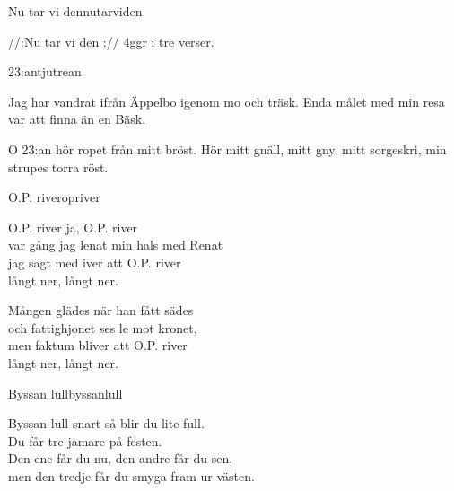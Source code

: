 \begin{song}{Nu tar vi den}{nutarviden}
\begin{vers}
//:Nu tar vi den :// 4ggr i tre verser.\\
\end{vers}
\end{song}

\newpage

\begin{song}{23:an}{tjutrean}
\begin{vers}
Jag har vandrat ifrån Äppelbo
igenom mo och träsk.
Enda målet med min resa var
att finna än en Bäsk.
\end{vers}
\begin{vers}
O 23:an hör ropet från mitt bröst.
Hör mitt gnäll, mitt gny,
mitt sorgeskri,
min strupes torra röst.
\end{vers}
\end{song}



\begin{song}{O.P. river}{opriver}
\begin{vers}
O.P. river ja, O.P. river\\
var gång jag lenat min hals med Renat\\
jag sagt med iver att O.P. river\\
långt ner, långt ner.\\
\end{vers}
\begin{vers}
Mången glädes när han fått sädes\\
och fattighjonet ses le mot kronet,\\
men faktum bliver att O.P. river\\
långt ner, långt ner.\\
\end{vers}
\end{song}

\begin{song}{Byssan lull}{byssanlull} 
\begin{vers}
Byssan lull snart så blir du lite full.\\
Du får tre jamare på festen.\\
Den ene får du nu, den andre får du sen,\\
men den tredje får du smyga fram ur västen.\\
\end{vers}
\end{song}


